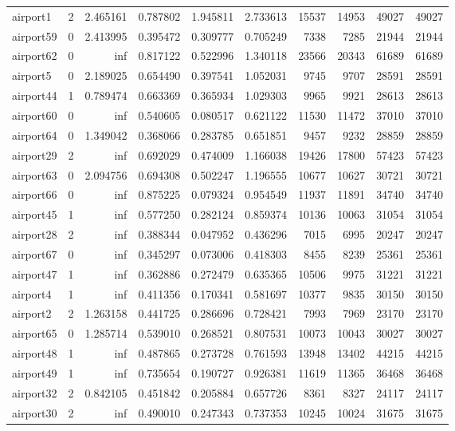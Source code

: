 \begin{longtable}{|l|r|r|r|r|r|r|r|r|r|}
airport1 & 2 & 2.465161 & 0.787802 & 1.945811 & 2.733613 & 15537 & 14953 & 49027 & 49027 \\
airport59 & 0 & 2.413995 & 0.395472 & 0.309777 & 0.705249 & 7338 & 7285 & 21944 & 21944 \\
airport62 & 0 & inf & 0.817122 & 0.522996 & 1.340118 & 23566 & 20343 & 61689 & 61689 \\
airport5 & 0 & 2.189025 & 0.654490 & 0.397541 & 1.052031 & 9745 & 9707 & 28591 & 28591 \\
airport44 & 1 & 0.789474 & 0.663369 & 0.365934 & 1.029303 & 9965 & 9921 & 28613 & 28613 \\
airport60 & 0 & inf & 0.540605 & 0.080517 & 0.621122 & 11530 & 11472 & 37010 & 37010 \\
airport64 & 0 & 1.349042 & 0.368066 & 0.283785 & 0.651851 & 9457 & 9232 & 28859 & 28859 \\
airport29 & 2 & inf & 0.692029 & 0.474009 & 1.166038 & 19426 & 17800 & 57423 & 57423 \\
airport63 & 0 & 2.094756 & 0.694308 & 0.502247 & 1.196555 & 10677 & 10627 & 30721 & 30721 \\
airport66 & 0 & inf & 0.875225 & 0.079324 & 0.954549 & 11937 & 11891 & 34740 & 34740 \\
airport45 & 1 & inf & 0.577250 & 0.282124 & 0.859374 & 10136 & 10063 & 31054 & 31054 \\
airport28 & 2 & inf & 0.388344 & 0.047952 & 0.436296 & 7015 & 6995 & 20247 & 20247 \\
airport67 & 0 & inf & 0.345297 & 0.073006 & 0.418303 & 8455 & 8239 & 25361 & 25361 \\
airport47 & 1 & inf & 0.362886 & 0.272479 & 0.635365 & 10506 & 9975 & 31221 & 31221 \\
airport4 & 1 & inf & 0.411356 & 0.170341 & 0.581697 & 10377 & 9835 & 30150 & 30150 \\
airport2 & 2 & 1.263158 & 0.441725 & 0.286696 & 0.728421 & 7993 & 7969 & 23170 & 23170 \\
airport65 & 0 & 1.285714 & 0.539010 & 0.268521 & 0.807531 & 10073 & 10043 & 30027 & 30027 \\
airport48 & 1 & inf & 0.487865 & 0.273728 & 0.761593 & 13948 & 13402 & 44215 & 44215 \\
airport49 & 1 & inf & 0.735654 & 0.190727 & 0.926381 & 11619 & 11365 & 36468 & 36468 \\
airport32 & 2 & 0.842105 & 0.451842 & 0.205884 & 0.657726 & 8361 & 8327 & 24117 & 24117 \\
airport30 & 2 & inf & 0.490010 & 0.247343 & 0.737353 & 10245 & 10024 & 31675 & 31675 \\

\end{longtable}
